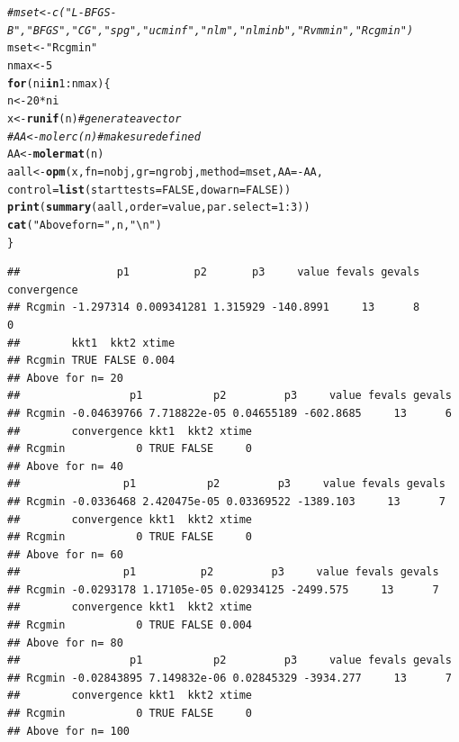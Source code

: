 \documentclass[10pt]{article}\usepackage[]{graphicx}\usepackage[]{color}
\makeatletter
\newcommand{\hlnum}[1]{\textcolor[rgb]{0.686,0.059,0.569}{#1}}%
\newcommand{\hlstr}[1]{\textcolor[rgb]{0.192,0.494,0.8}{#1}}%
\newcommand{\hlcom}[1]{\textcolor[rgb]{0.678,0.584,0.686}{\textit{#1}}}%
\newcommand{\hlopt}[1]{\textcolor[rgb]{0,0,0}{#1}}%
\newcommand{\hlstd}[1]{\textcolor[rgb]{0.345,0.345,0.345}{#1}}%
\newcommand{\hlkwa}[1]{\textcolor[rgb]{0.161,0.373,0.58}{\textbf{#1}}}%
\newcommand{\hlkwb}[1]{\textcolor[rgb]{0.69,0.353,0.396}{#1}}%
\newcommand{\hlkwc}[1]{\textcolor[rgb]{0.333,0.667,0.333}{#1}}%
\newcommand{\hlkwd}[1]{\textcolor[rgb]{0.737,0.353,0.396}{\textbf{#1}}}%
\newenvironment{kframe}{%
 \def\at@end@of@kframe{}%
 \ifinner\ifhmode%
  \def\at@end@of@kframe{\end{minipage}}%
  \begin{minipage}{\columnwidth}%
 \fi\fi%
 \def\FrameCommand##1{\hskip\@totalleftmargin \hskip-\fboxsep
 \colorbox{shadecolor}{##1}\hskip-\fboxsep
     \hskip-\linewidth \hskip-\@totalleftmargin \hskip\columnwidth}%
 \MakeFramed {\advance\hsize-\width
   \@totalleftmargin\z@ \linewidth\hsize
   \@setminipage}}%
 {\par\unskip\endMakeFramed%
 \at@end@of@kframe}
\newenvironment{knitrout}{}{} %
\makeatother
\begin{document}
\begin{knitrout}
\begin{kframe}
{\ttfamily\noindent\itshape\color{messagecolor}{\#\# Loading required package: optimrx}}\begin{alltt}
\hlcom{# mset<-c("L-BFGS-B", "BFGS", "CG", "spg", "ucminf", "nlm", "nlminb", "Rvmmin", "Rcgmin")}
\hlstd{mset}\hlkwb{<-}\hlstr{"Rcgmin"}
\hlstd{nmax}\hlkwb{<-}\hlnum{5}
\hlkwa{for} \hlstd{(ni} \hlkwa{in} \hlnum{1}\hlopt{:}\hlstd{nmax)\{}
  \hlstd{n}\hlkwb{<-}\hlnum{20}\hlopt{*}\hlstd{ni}
  \hlstd{x}\hlkwb{<-}\hlkwd{runif}\hlstd{(n)} \hlcom{# generate a vector }
\hlcom{#  AA<-molerc(n) # make sure defined}
  \hlstd{AA}\hlkwb{<-}\hlkwd{molermat}\hlstd{(n)}
  \hlstd{aall}\hlkwb{<-}\hlkwd{opm}\hlstd{(x,} \hlkwc{fn}\hlstd{=nobj,} \hlkwc{gr}\hlstd{=ngrobj,} \hlkwc{method}\hlstd{=mset,} \hlkwc{AA}\hlstd{=}\hlopt{-}\hlstd{AA,}
     \hlkwc{control}\hlstd{=}\hlkwd{list}\hlstd{(}\hlkwc{starttests}\hlstd{=}\hlnum{FALSE}\hlstd{,}  \hlkwc{dowarn}\hlstd{=}\hlnum{FALSE}\hlstd{))}
  \hlkwd{print}\hlstd{(}\hlkwd{summary}\hlstd{(aall,} \hlkwc{order}\hlstd{=value,} \hlkwc{par.select}\hlstd{=}\hlnum{1}\hlopt{:}\hlnum{3}\hlstd{))}
  \hlkwd{cat}\hlstd{(}\hlstr{"Above for n="}\hlstd{,n,}\hlstr{" \textbackslash{}n"}\hlstd{)}
\hlstd{\}}
\end{alltt}
\begin{verbatim}
##               p1          p2       p3     value fevals gevals convergence
## Rcgmin -1.297314 0.009341281 1.315929 -140.8991     13      8           0
##        kkt1  kkt2 xtime
## Rcgmin TRUE FALSE 0.004
## Above for n= 20  
##                 p1           p2         p3     value fevals gevals
## Rcgmin -0.04639766 7.718822e-05 0.04655189 -602.8685     13      6
##        convergence kkt1  kkt2 xtime
## Rcgmin           0 TRUE FALSE     0
## Above for n= 40  
##                p1           p2         p3     value fevals gevals
## Rcgmin -0.0336468 2.420475e-05 0.03369522 -1389.103     13      7
##        convergence kkt1  kkt2 xtime
## Rcgmin           0 TRUE FALSE     0
## Above for n= 60  
##                p1          p2         p3     value fevals gevals
## Rcgmin -0.0293178 1.17105e-05 0.02934125 -2499.575     13      7
##        convergence kkt1  kkt2 xtime
## Rcgmin           0 TRUE FALSE 0.004
## Above for n= 80  
##                 p1           p2         p3     value fevals gevals
## Rcgmin -0.02843895 7.149832e-06 0.02845329 -3934.277     13      7
##        convergence kkt1  kkt2 xtime
## Rcgmin           0 TRUE FALSE     0
## Above for n= 100
\end{verbatim}
\end{kframe}
\end{knitrout}
\end{document}
